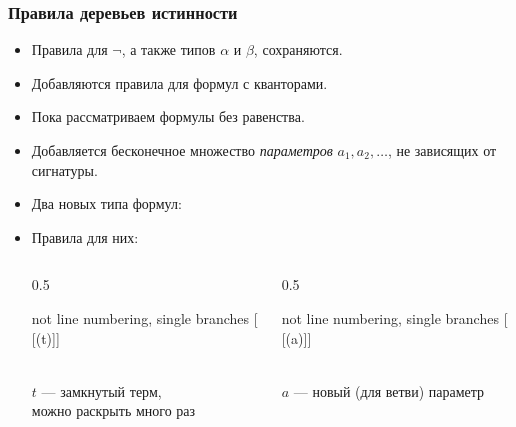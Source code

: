 \documentclass[10pt]{beamer}
\begin{document}
\begin{frame}
\frametitle{Правила деревьев истинности}
\begin{itemize}
    \item Правила для $\neg$, а также типов $\alpha$ и $\beta$, сохраняются.
    \item Добавляются правила для формул с кванторами.
    \item Пока рассматриваем формулы без равенства.
    \item Добавляется бесконечное множество \emph{параметров} $a_1,a_2,\ldots$, не зависящих от сигнатуры.
    \item Два новых типа формул: \pause
    \item Правила для них: \pause
\vspace{-0.5em}
\begin{columns}
    \begin{column}{0.5\textwidth}
        \begin{center}
            \begin{tableau}{not line numbering, single branches}
                [{\gamma} [\gamma(t)]]
            \end{tableau}\\
            \vspace{0.25em}
            $t$ --- замкнутый терм,\\ можно раскрыть много раз
        \end{center}
    \end{column} \pause
    \begin{column}{0.5\textwidth}
        \begin{center}
            \begin{tableau}{not line numbering, single branches}
                [{\delta} [\delta(a)]]
            \end{tableau}\\
        \vspace{0.25em}
        $a$ --- новый (для ветви) параметр
        \end{center}
    \end{column}
\end{columns}
\end{itemize}
\end{frame}
\end{document}
